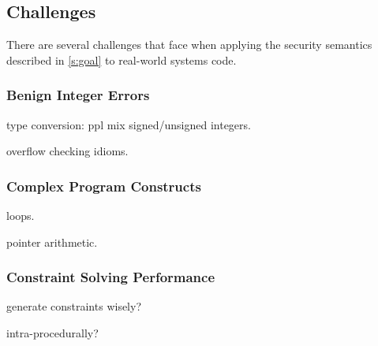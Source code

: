 \subsection{Challenges}
\label{s:chal}

There are several challenges that face \sys when applying the
security semantics described in \autoref{s:goal} to real-world
systems code.

\subsubsection*{Benign Integer Errors}

type conversion: ppl mix signed/unsigned integers.

overflow checking idioms.

\subsubsection*{Complex Program Constructs}

loops.

pointer arithmetic.

\subsubsection*{Constraint Solving Performance}

generate constraints wisely?

intra-procedurally?

